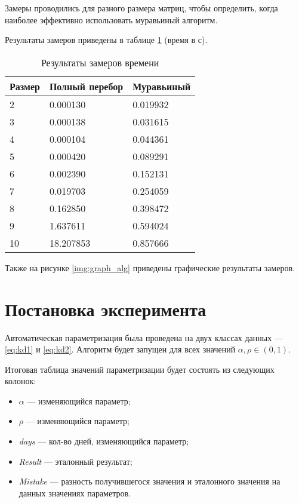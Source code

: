 Замеры проводились для разного размера матриц, чтобы определить, когда наиболее эффективно использовать муравьиный алгоритм.

Результаты замеров приведены в таблице \ref{tbl:time_mes} (время в с).


\begin{center}
	\captionsetup{justification=raggedright,singlelinecheck=off}
	\begin{longtable}[c]{|p{4cm}|p{4cm}|p{4cm}|}
		\caption{Результаты замеров времени\label{tbl:time_mes}}\\ \hline
		Размер & Полный перебор & Муравьиный \\ \hline
		2 &   0.000130 &   0.019932 \\ \hline
		3 &   0.000138 &   0.031615 \\ \hline
		4 &   0.000104 &   0.044361 \\ \hline
		5 &   0.000420 &   0.089291 \\ \hline
		6 &   0.002390 &   0.152131 \\ \hline
		7 &   0.019703 &   0.254059 \\ \hline
		8 &   0.162850 &   0.398472 \\ \hline
		9 &   1.637611 &   0.594024 \\ \hline
		10 &  18.207853 &   0.857666 \\ \hline
	\end{longtable}
\end{center}

\clearpage

Также на рисунке \ref{img:graph_alg} приведены графические результаты замеров.


\clearpage


\section{Постановка эксперимента}

Автоматическая параметризация была проведена на двух классах данных --- \ref{eq:kd1} и \ref{eq:kd2}. Алгоритм будет запущен для всех значений $\alpha, \rho \in (0, 1)$.

Итоговая таблица значений параметризации будет состоять из следующих колонок:
\begin{itemize}
	\item $\alpha$ --- изменяющийся параметр;
	\item $\rho$ --- изменяющийся параметр;
	\item \textit{days} --- кол-во дней, изменяющийся параметр;
	\item \textit{Result} --- эталонный результат;
	\item \textit{Mistake} --- разность получившегося значения и эталонного значения на данных значениях параметров.
\end{itemize}

